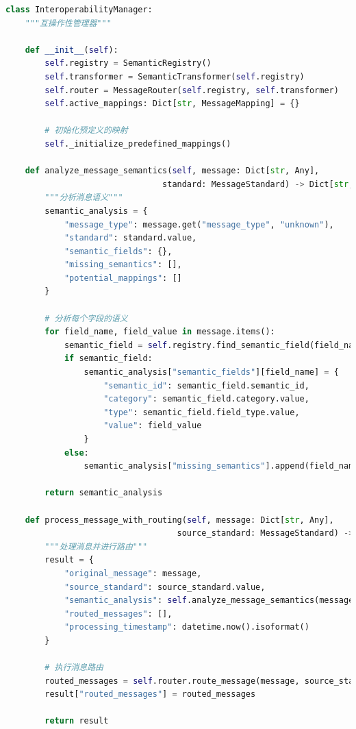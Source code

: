 \begin{lstlisting}[language=Python, label=fig:semantic_interop]
class InteroperabilityManager:
    """互操作性管理器"""
    
    def __init__(self):
        self.registry = SemanticRegistry()
        self.transformer = SemanticTransformer(self.registry)
        self.router = MessageRouter(self.registry, self.transformer)
        self.active_mappings: Dict[str, MessageMapping] = {}
        
        # 初始化预定义的映射
        self._initialize_predefined_mappings()
    
    def analyze_message_semantics(self, message: Dict[str, Any], 
                                standard: MessageStandard) -> Dict[str, Any]:
        """分析消息语义"""
        semantic_analysis = {
            "message_type": message.get("message_type", "unknown"),
            "standard": standard.value,
            "semantic_fields": {},
            "missing_semantics": [],
            "potential_mappings": []
        }
        
        # 分析每个字段的语义
        for field_name, field_value in message.items():
            semantic_field = self.registry.find_semantic_field(field_name)
            if semantic_field:
                semantic_analysis["semantic_fields"][field_name] = {
                    "semantic_id": semantic_field.semantic_id,
                    "category": semantic_field.category.value,
                    "type": semantic_field.field_type.value,
                    "value": field_value
                }
            else:
                semantic_analysis["missing_semantics"].append(field_name)
        
        return semantic_analysis
    
    def process_message_with_routing(self, message: Dict[str, Any], 
                                   source_standard: MessageStandard) -> Dict[str, Any]:
        """处理消息并进行路由"""
        result = {
            "original_message": message,
            "source_standard": source_standard.value,
            "semantic_analysis": self.analyze_message_semantics(message, source_standard),
            "routed_messages": [],
            "processing_timestamp": datetime.now().isoformat()
        }
        
        # 执行消息路由
        routed_messages = self.router.route_message(message, source_standard)
        result["routed_messages"] = routed_messages
        
        return result
\end{lstlisting}

